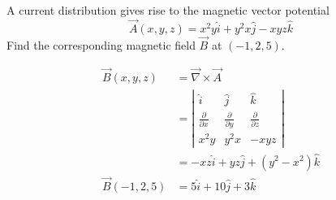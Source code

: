 \begin{exercise}
	A current distribution gives rise to the magnetic vector potential
	$$
	\vec{A}(x, y, z)=x^{2} y \hat{i}+y^{2} x \hat{j}-x y z \hat{k} 
	$$
	Find the corresponding magnetic field $\vec{B}$ at $(-1,2,5)$.
\end{exercise}
\begin{answer}
	\begin{align*}
	\vec{B}(x, y, z)&=\vec{\nabla} \times \vec{A}\\&=\left|\begin{array}{ccc}
	\hat{i} & \hat{j} & \hat{k} \\
	\frac{\partial}{\partial x} & \frac{\partial}{\partial y} & \frac{\partial}{\partial z} \\
	x^{2} y & y^{2} x & -x y z
	\end{array}\right|\\&=-x z \hat{i}+y z \hat{j}+\left(y^{2}-x^{2}\right) \hat{k}\\
	\vec{B}(-1,2,5)&=5 \hat{i}+10 \hat{j}+3 \hat{k}
	\end{align*}
\end{answer}
